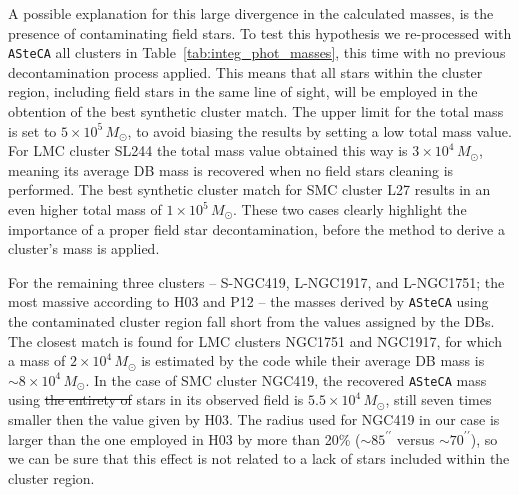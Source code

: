 \documentclass[draft]{aa}
\providecommand{\DIFaddtex}[1]{{\protect\color{blue}\uwave{#1}}} %
\providecommand{\DIFdeltex}[1]{{\protect\color{red}\sout{#1}}}                      %
\providecommand{\DIFaddbegin}{} %
\providecommand{\DIFaddend}{} %
\providecommand{\DIFdelbegin}{} %
\providecommand{\DIFdelend}{} %
\providecommand{\DIFadd}[1]{\texorpdfstring{\DIFaddtex{#1}}{#1}} %
\providecommand{\DIFdel}[1]{\texorpdfstring{\DIFdeltex{#1}}{}} %
\begin{document}
A possible explanation for this large divergence in the calculated masses, is
the presence of contaminating field stars.
To test this hypothesis we re-processed with \texttt{ASteCA} all clusters in
Table~\ref{tab:integ_phot_masses}, this time with no previous decontamination
process applied. This means that all stars within the cluster region, including
field stars in the same line of sight, will be employed in the obtention of 
the best synthetic cluster match. The upper limit for the total mass is set to
$5{\times}10^5\,M_{\odot}$, to avoid biasing the results by setting a low total
mass value.
%
For LMC cluster SL244 the total mass value obtained this way is
$3{\times}10^4\,M_{\odot}$, meaning its average DB mass is recovered when no
field stars cleaning is performed.
The best synthetic cluster match for SMC cluster L27 results in an even higher
total mass of $1{\times}10^5\,M_{\odot}$. These two cases clearly highlight the
importance of a proper field star decontamination, before the method to derive a
cluster's mass is applied.

For the remaining three clusters -- S-NGC419, L-NGC1917, and L-NGC1751; the most
massive according to H03 and P12 -- the masses derived by \texttt{ASteCA} using
the contaminated cluster region fall short from the values assigned by the DBs.
The closest match is found for LMC clusters NGC1751 and NGC1917, for which a
mass of $2{\times}10^4\,M_{\odot}$ is estimated by the code while their average
DB mass is ${\sim}8{\times}10^4\,M_{\odot}$.
In the case of SMC cluster NGC419, the recovered \texttt{ASteCA} mass using \DIFdelbegin \DIFdel{the
entirety of }\DIFdelend \DIFaddbegin \DIFadd{all
the }\DIFaddend stars in its observed field is $5.5{\times}10^4\,M_{\odot}$, still
seven times smaller then the value given by H03. The radius used for NGC419 in
our case is larger than the one employed in H03 by more than 20\%
(${\sim}85^{\prime\prime}$ versus ${\sim}70^{\prime\prime}$), so we can be sure
that this effect is not related to a lack of stars included within the cluster
region.
\end{document}

